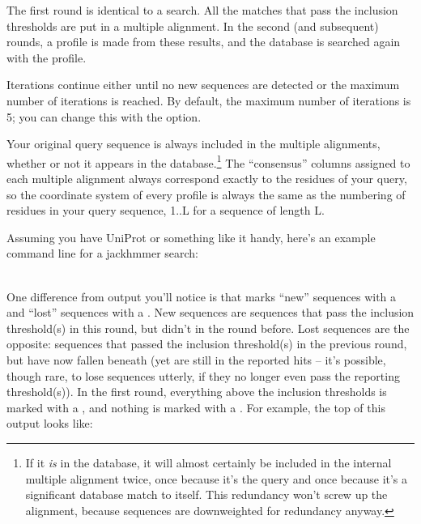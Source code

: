The first round is identical to a  search. All the
matches that pass the inclusion thresholds are put in a multiple
alignment. In the second (and subsequent) rounds, a profile is made
from these results, and the database is searched again with the
profile.

Iterations continue either until no new sequences are detected or the
maximum number of iterations is reached. By default, the maximum
number of iterations is 5; you can change this with the 
option.

Your original query sequence is always included in the multiple
alignments, whether or not it appears in the database.\footnote{If it
  \emph{is} in the database, it will almost certainly be included in
  the internal multiple alignment twice, once because it's the query
  and once because it's a significant database match to itself. This
  redundancy won't screw up the alignment, because sequences are
  downweighted for redundancy anyway.}  
The ``consensus'' columns assigned to each multiple alignment always
correspond exactly to the residues of your query, so the coordinate
system of every profile is always the same as the numbering of
residues in your query sequence, 1..L for a sequence of length L.

Assuming you have UniProt or something like it handy, here's an
example command line for a jackhmmer search:

\\

One difference from  output you'll notice is that
 marks ``new'' sequences with a \ccode{+} and ``lost''
sequences with a \ccode{-}. New sequences are sequences that pass the
inclusion threshold(s) in this round, but didn't in the round before.
Lost sequences are the opposite: sequences that passed the inclusion
threshold(s) in the previous round, but have now fallen beneath (yet
are still in the reported hits -- it's possible, though rare, to lose
sequences utterly, if they no longer even pass the reporting
threshold(s)).  In the first round, everything above the inclusion
thresholds is marked with a \ccode{+}, and nothing is marked with a
\ccode{-}. For example, the top of this output looks like:

